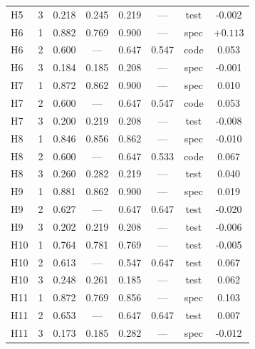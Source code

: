 \begin{table}[!htbp]
\begin{tabular}{@{}lccccccc@{}}
H5 & 3 & 0.218 & 0.245 & 0.219 & --- & test & -0.002 \\
H6 & 1 & 0.882 & 0.769 & 0.900 & --- & spec & $\mathbf{+0.113}$ \\
H6 & 2 & 0.600 & --- & 0.647 & 0.547 & code & 0.053 \\
H6 & 3 & 0.184 & 0.185 & 0.208 & --- & spec & -0.001 \\
H7 & 1 & 0.872 & 0.862 & 0.900 & --- & spec & 0.010 \\
H7 & 2 & 0.600 & --- & 0.647 & 0.547 & code & 0.053 \\
H7 & 3 & 0.200 & 0.219 & 0.208 & --- & test & -0.008 \\
H8 & 1 & 0.846 & 0.856 & 0.862 & --- & spec & -0.010 \\
H8 & 2 & 0.600 & --- & 0.647 & 0.533 & code & 0.067 \\
H8 & 3 & 0.260 & 0.282 & 0.219 & --- & test & 0.040 \\
H9 & 1 & 0.881 & 0.862 & 0.900 & --- & spec & 0.019 \\
H9 & 2 & 0.627 & --- & 0.647 & 0.647 & test & -0.020 \\
H9 & 3 & 0.202 & 0.219 & 0.208 & --- & test & -0.006 \\
H10 & 1 & 0.764 & 0.781 & 0.769 & --- & test & -0.005 \\
H10 & 2 & 0.613 & --- & 0.547 & 0.647 & test & 0.067 \\
H10 & 3 & 0.248 & 0.261 & 0.185 & --- & test & 0.062 \\
H11 & 1 & 0.872 & 0.769 & 0.856 & --- & spec & 0.103 \\
H11 & 2 & 0.653 & --- & 0.647 & 0.647 & test & 0.007 \\
H11 & 3 & 0.173 & 0.185 & 0.282 & --- & spec & -0.012 \\
\bottomrule
\end{tabular}
\end{table}
